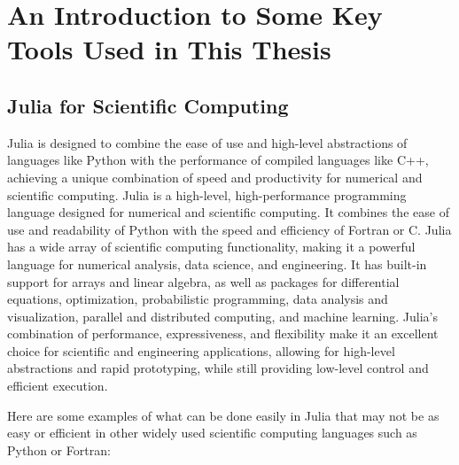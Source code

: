\section{An Introduction to Some Key Tools Used in This Thesis }

\subsection{Julia for Scientific Computing}

Julia is designed to combine the ease of use and high-level abstractions of languages like Python with the performance of compiled languages like C++, achieving a unique combination of speed and productivity for numerical and scientific computing.  Julia is a high-level, high-performance programming language designed for numerical and scientific computing. It combines the ease of use and readability of Python with the speed and efficiency of Fortran or C.   Julia has a wide array of scientific computing functionality, making it a powerful language for numerical analysis, data science, and engineering. It has built-in support for arrays and linear algebra, as well as packages for differential equations, optimization, probabilistic programming, data analysis and visualization, parallel and distributed computing, and machine learning. Julia's combination of performance, expressiveness, and flexibility make it an excellent choice for scientific and engineering applications, allowing for high-level abstractions and rapid prototyping, while still providing low-level control and efficient execution.

Here are some examples of what can be done easily in Julia that may not be as easy or efficient in other widely used scientific computing languages such as Python or Fortran:

